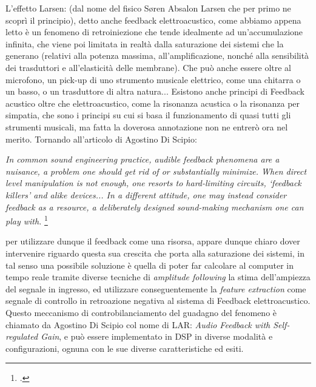L'effetto Larsen: (dal nome del fisico Søren Absalon Larsen
che per primo ne scoprì il principio), detto anche feedback elettroacustico,
come abbiamo appena letto è un fenomeno di retroiniezione che tende idealmente 
ad un'accumulazione infinita, che viene poi limitata in realtà dalla saturazione dei sistemi 
che la generano (relativi alla potenza massima, all'amplificazione, nonché alla sensibilità dei
trasduttori e all'elasticità delle membrane). Che può anche essere oltre al microfono, un
pick-up di uno strumento musicale elettrico, come una chitarra o un basso, o un trasduttore di
altra natura... 
Esistono anche principi di Feedback acustico oltre che elettroacustico, 
come la risonanza acustica o la risonanza per simpatia,
che sono i principi su cui si basa il funzionamento di quasi tutti gli strumenti musicali,
ma fatta la doverosa annotazione non ne entrerò ora nel merito.
Tornando all'articolo di Agostino Di Scipio:

\begin{center}
\vspace{0.5cm}
\textit{In common sound engineering practice, audible feedback phenomena are a nuisance, a problem one
should get rid of or substantially minimize. When direct level manipulation is not enough, one
resorts to hard-limiting circuits, ‘feedback killers’ and alike devices... 
In a different attitude, one may instead consider feedback as
a resource, a deliberately designed sound-making mechanism one can play with.} \footcite{di_scipio_relational_2022}
\vspace{0.5cm}
\vspace{0.5cm}
\end{center}

per utilizzare dunque il feedback come una
risorsa, appare dunque chiaro dover intervenire riguardo questa sua crescita che porta alla saturazione dei sistemi, in tal senso una possibile soluzione è quella di poter far calcolare
al computer in tempo reale tramite diverse tecniche di \textit{amplitude following} la stima dell'ampiezza
del segnale in ingresso, ed utilizzare conseguentemente la \textit{feature extraction} come segnale di controllo in retroazione negativa al sistema di Feedback elettroacustico.
Questo meccanismo di controbilanciamento del guadagno
del fenomeno è chiamato da Agostino Di Scipio col nome di LAR: \textit{Audio Feedback with Self-regulated Gain},
e può essere implementato in DSP in diverse modalità e configurazioni,
ognuna con le sue diverse caratteristiche ed esiti. \\

